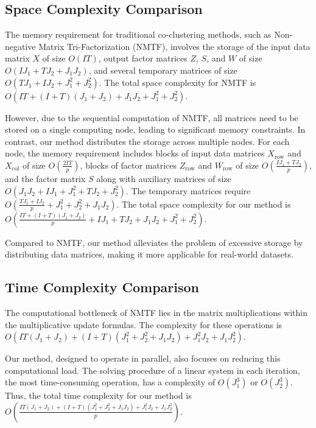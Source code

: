 \documentclass[journal]{IEEEtran}
\begin{document}
\subsection{Space Complexity Comparison}

The memory requirement for traditional co-clustering methods, such as Non-negative Matrix Tri-Factorization (NMTF), involves the storage of the input data matrix $X$ of size $O(IT)$, output factor matrices $Z$, $S$, and $W$ of size $O(IJ_1 + TJ_2 + J_1J_2)$, and several temporary matrices of size $O(TJ_1 + IJ_2 + J_1^2 + J_2^2)$. The total space complexity for NMTF is $O(IT + (I + T)(J_1 + J_2) + J_1J_2 + J_1^2 + J_2^2)$.

However, due to the sequential computation of NMTF, all matrices need to be stored on a single computing node, leading to significant memory constraints. In contrast, our method distributes the storage across multiple nodes. For each node, the memory requirement includes blocks of input data matrices $X_{\text{row}}$ and $X_{\text{col}}$ of size $O(\frac{2IT}{p})$, blocks of factor matrices $Z_{\text{row}}$ and $W_{\text{row}}$ of size $O(\frac{IJ_1 + TJ_2}{p})$, and the factor matrix $S$ along with auxiliary matrices of size $O(J_1J_2 + IJ_1 + J_1^2 + TJ_2 + J_2^2)$. The temporary matrices require $O(\frac{TJ_1 + IJ_2}{p} + J_1^2 + J_2^2 + J_1J_2)$. The total space complexity for our method is $O(\frac{IT + (I + T)(J_1 + J_2)}{p} + IJ_1 + TJ_2 + J_1J_2 + J_1^2 + J_2^2)$.

Compared to NMTF, our method alleviates the problem of excessive storage by distributing data matrices, making it more applicable for real-world datasets.

\subsection{Time Complexity Comparison}

The computational bottleneck of NMTF lies in the matrix multiplications within the multiplicative update formulas. The complexity for these operations is $O(IT(J_1 + J_2) + (I + T)(J_1^2 + J_2^2 + J_1J_2) + J_1^2J_2 + J_1J_2^2)$.

Our method, designed to operate in parallel, also focuses on reducing this computational load. The solving procedure of a linear system in each iteration, the most time-consuming operation, has a complexity of $O(J_1^3)$ or $O(J_2^3)$. Thus, the total time complexity for our method is $O(\frac{IT(J_1 + J_2) + (I + T)(J_1^2 + J_2^2 + J_1J_2) + J_1^2J_2 + J_1J_2^2}{p})$.
\end{document}
